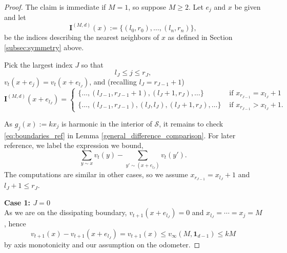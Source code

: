 \documentclass[12pt]{amsart}
\begin{document}
	\begin{proof}
	The claim is immediate if $M = 1$, so suppose $M \geq 2$. 
 Let $e_j$ and $x$ be given and let
	\begin{equation}
	\mathbf{I}^{(M,d)}(x) := \{ (l_0, r_0), \ldots,(l_n, r_n)\}, 
	\end{equation}
	be the indices describing the nearest neighbors of $x$ as defined in Section \ref{subsec:symmetry} above. 

	Pick the largest index $J$ so that 
	\[
	l_{J} \leq j \leq r_{J},
	\]	
	$v_t(x + e_j) = v_t(x+e_{l_J})$, and  (recalling $l_J = r_{J-1} + 1$)
	\begin{equation} \label{eq:neighbor_sym}
	\mathbf{I}^{(M,d)}(x + e_{l_J} ) = 
	\begin{cases}
	\{ \ldots,  (l_{J-1}, r_{J-1} + 1), ( l_J + 1, r_J), \ldots \} &\mbox{ if $x_{r_{J-1}} = x_{l_J} + 1$}  \\
	\{ \ldots,  (l_{J-1}, r_{J-1}), ( l_J, l_J),  (l_J+1, r_J), \ldots \} &\mbox{ if $x_{r_{J-1}} > x_{l_J} + 1$} .
	\end{cases}
	\end{equation}
	
	
	As $g_j(x) := k x_j$ is harmonic in the interior of $\mathcal{S}$, it remains to check \eqref{eq:boundaries_ref} in Lemma \ref{general_difference_comparison}. 
	For later reference, we label the expression we bound,
	\begin{equation} \label{eq:neighbor_sum}
	\sum_{y \sim x} v_t(y) - \sum_{y' \sim (x+e_{l_J})} v_t(y').  
	\end{equation}
	 The computations are similar in other cases, so we assume $x_{r_{J-1}} = x_{l_J} + 1$ and $l_J + 1 \leq r_J$. 
	
	
	{\bf Case 1: $J = 0$} \\
	As we are on the dissipating boundary, $v_{t+1}(x+e_{l_J}) = 0$ and $x_{l_J} = \cdots = x_j = M$, hence 
	\[
	v_{t+1}(x) - v_{t+1}(x + e_{l_J})  = v_{t+1}(x) \leq v_{\infty}(M, \mathbf{1}_{d-1}) \leq k M
	\]
	 by axis monotonicity and our assumption on the odometer. 
	


\end{proof}
\end{document}
